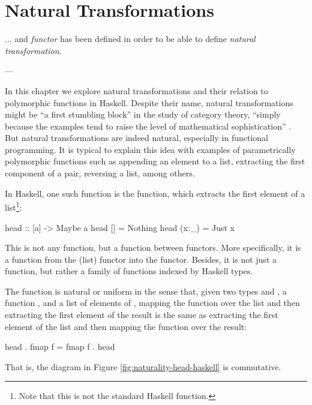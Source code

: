 \chapter{Natural Transformations}
\label{chap:naturals}

\epigraph{
  ... and \emph{functor} has been defined in order to be able to
  define \emph{natural transformation}.
}{---\textcite[18]{maclane-1998}}

In this chapter we explore natural transformations and their relation
to polymorphic functions in Haskell. Despite their name, natural
transformations might be ``a first stumbling block'' in the study of
category theory, ``simply because the examples tend to raise the level
of mathematical sophistication'' \parencites[433]{poigne-1992}. But
natural transformations are indeed natural, especially in functional
programming. It is typical to explain this idea with examples of
parametrically polymorphic functions such as appending an element to a
list, extracting the first component of a pair, reversing a list,
among others.

In Haskell, one such function is the  function,
which extracts the first element of a list\footnote{Note that this is
  not the standard Haskell  function.}:
\begin{codehaskell}
head :: [a] -> Maybe a
head []    = Nothing
head (x:_) = Just x
\end{codehaskell}
This is not any function, but a function between functors. More
specifically, it is a function from the \texthaskell{[]} (list)
functor into the  functor. Besides, it is not just
a function, but rather a family of functions indexed by Haskell types.

The  function is natural or uniform in the sense
that, given two types  and , a function
, and a list of elements of ,
mapping the function over the list and then extracting the first
element of the result is the same as extracting the first element of
the list and then mapping the function over the result:
\begin{codehaskell}
head . fmap f = fmap f . head
\end{codehaskell}
That is, the diagram in Figure \ref{fig:naturality-head-haskell} is
commutative.

